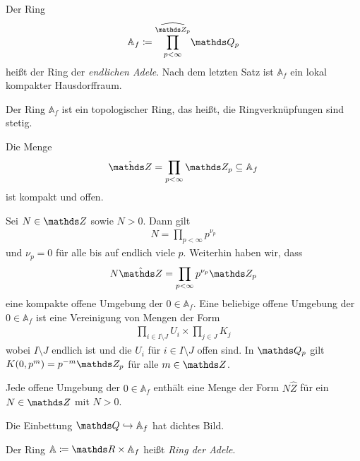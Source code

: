 \begin{defi}
Der Ring
\begin{align*}
\mathbb{A}_f \coloneqq \widehat{\prod_{p<\infty}^{\Z_p}} \Q_p
\end{align*}
heißt der Ring der \emph{endlichen Adele}.
Nach dem letzten Satz ist $\mathbb{A}_f$ ein lokal kompakter Hausdorffraum.
\end{defi}


\begin{prop}
Der Ring $\mathbb{A}_f$ ist ein topologischer Ring, das heißt, die Ringverknüpfungen sind stetig.
\end{prop}

\begin{prop}
Die Menge
\begin{align*}
\hat{\Z}=\prod_{p <\infty} \Z_p \subseteq \mathbb{A}_f
\end{align*}
ist kompakt und offen.
\end{prop}

Sei $N\in \Z$ sowie $N>0$. Dann gilt
\begin{align*}
N=\prod_{p<\infty} p^{\nu_p}
\end{align*}
und $\nu_p=0$ für alle bis auf endlich viele $p$.
Weiterhin haben wir, dass
\begin{align*}
N \hat{\Z}=\prod_{p <\infty} p^{\nu_p}\Z_p
\end{align*}
eine kompakte offene Umgebung der $0 \in \mathbb{A}_f$.
Eine beliebige offene Umgebung der $0 \in \mathbb{A}_f$ ist eine Vereinigung von Mengen der Form
\begin{align*}
\prod_{i \in I\setminus J} U_i \times \prod_{j \in J} K_j
\end{align*}
wobei $I\setminus J$ endlich ist und die $U_i$ für $i \in I \setminus J$ offen sind.
In $\Q_p$ gilt $K(0,p^m)=p^{-m}\Z_p$ für alle $m \in \Z$.

\begin{prop}
Jede offene Umgebung der $0\in \mathbb{A}_f$ enthält eine Menge der Form $N \hat{Z}$ für ein $N \in \Z$ mit $N>0$.
\end{prop}

\begin{prop}
Die Einbettung $\Q \hookrightarrow \mathbb{A}_f$ hat dichtes Bild.
\end{prop}

\begin{defi}
Der Ring $\mathbb{A} \coloneqq \R \times \mathbb{A}_f$ heißt \emph{Ring der Adele}.
\end{defi}

